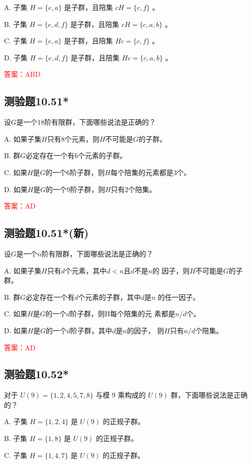 \documentclass[UTF8, heading=true]{ctexart}
\begin{document}
A. 子集 $H=\{e, a\}$ 是子群，且陪集 $c H=\{c, f\}$ 。

B. 子集 $H=\{e, d, f\}$ 是子群，且陪集 $c H=\{c, a, b\}$ 。

C. 子集 $H=\{e, a\}$ 是子群，且陪集 $H c=\{c, f\}$ 。

D. 子集 $H=\{e, d, f\}$ 是子群，且陪集 $H c=\{c, a, b\}$ 。

\textcolor{red}{答案：ABD}

\subsection{测验题10.51*}

设$G$是一个18阶有限群，下面哪些说法是正确的？

A. 如果子集$H$只有8个元素，则$H$不可能是$G$的子群。

B. 群$G$必定存在一个有6个元素的子群。

C. 如果$H$是$G$的一个6阶子群，则$H$每个陪集的元素都是3个。

D. 如果$H$是$G$的一个9阶子群，则$H$只有2个陪集。

\textcolor{red}{答案：AD}

\subsection{测验题10.51*(新)}

设$G$是一个$n$阶有限群，下面哪些说法是正确的？

A. 如果子集$H$只有$d$个元素，其中$d<n$且$d$不是$n$的
因子，则$H$不可能是$G$的子群。

B. 群$G$必定存在一个有$d$个元素的子群，其中$d$是$n$
的任一因子。

C. 如果$H$是$G$的一个$d$阶子群，则H每个陪集的元
素都是$n/d$个。

D. 如果$H$是$G$的一个$d$阶子群，其中$d$是$n$的因子，
则$H$只有$n/d$个陪集。

\textcolor{red}{答案：AD}

\subsection{测验题10.52*}

对于 $U(9)=\{1,2,4,5,7,8\}$ 与模 9 乘构成的 $U(9)$ 群，下面哪些说法是正确的？

A. 子集 $H=\{1,2,4\}$ 是 $U(9)$ 的正规子群。

B. 子集 $H=\{1,8\}$ 是 $U(9)$ 的正规子群。

C. 子集 ${H}=\{1,4,7\}$ 是 ${U}(9)$ 的正规子群。
\end{document}
